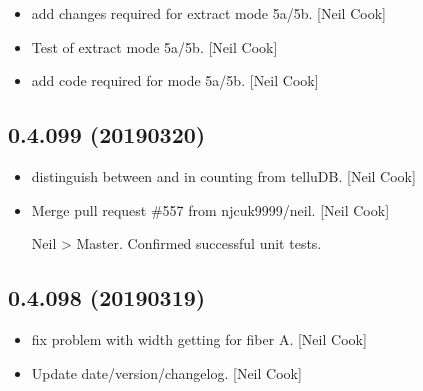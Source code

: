 \documentclass[a4paper,10pt,english]{report}
\begin{document}
\begin{itemize}
\item {} 
 \sphinxhyphen{} add changes required for extract mode 5a/5b. {[}Neil
Cook{]}

\item {} 
Test of extract mode 5a/5b. {[}Neil Cook{]}

\item {} 
 \sphinxhyphen{} add code required for mode 5a/5b. {[}Neil
Cook{]}

\end{itemize}


\subsection{0.4.099 (2019\sphinxhyphen{}03\sphinxhyphen{}20)}
\label{\detokenize{misc/changelog:id179}}\begin{itemize}
\item {} 
 \sphinxhyphen{} distinguish between  and 
in counting from telluDB. {[}Neil Cook{]}

\item {} 
Merge pull request \#557 from njcuk9999/neil. {[}Neil Cook{]}

Neil \textendash{}\textgreater{} Master. Confirmed successful unit tests.

\end{itemize}


\subsection{0.4.098 (2019\sphinxhyphen{}03\sphinxhyphen{}19)}
\label{\detokenize{misc/changelog:id180}}\begin{itemize}
\item {} 
 \sphinxhyphen{} fix problem with width getting for fiber
A. {[}Neil Cook{]}

\item {} 
Update date/version/changelog. {[}Neil Cook{]}

\end{itemize}
\end{document}
